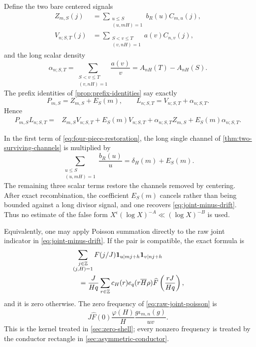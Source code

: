 Define the two bare centered signals
\begin{align}
 Z_{m,S}(j)&=
 \sum_{\substack{u\le S\\(u,mH)=1}}b_R(u)C_{m,u}(j),
 \label{eq:bare-short-signal}\\
 V_{n;S,T}(j)&=
 \sum_{\substack{S<v\le T\\(v,nH)=1}}a(v)C_{n,v}(j),
 \label{eq:bare-long-signal}
\end{align}
and the long scalar density
\begin{equation}
 \alpha_{n;S,T}
 =\sum_{\substack{S<v\le T\\(v,nH)=1}}\frac{a(v)}v
 =A_{nH}(T)-A_{nH}(S).
 \label{eq:long-scalar-density}
\end{equation}
The prefix identities of \cref{prop:prefix-identities} say exactly
\begin{equation}
 P_{m,S}=Z_{m,S}+E_S(m),
 \qquad
 L_{n;S,T}=V_{n;S,T}+\alpha_{n;S,T}.
 \label{eq:scalar-restoration}
\end{equation}
Hence
\begin{align}
 P_{m,S}L_{n;S,T}
 ={}&Z_{m,S}V_{n;S,T}
 +E_S(m)V_{n;S,T}
 +\alpha_{n;S,T}Z_{m,S}
 +E_S(m)\alpha_{n;S,T}.
 \label{eq:four-piece-restoration}
\end{align}

In the first term of \eqref{eq:four-piece-restoration}, the long
single channel of \cref{thm:two-surviving-channels} is multiplied by
\begin{equation}
 \sum_{\substack{u\le S\\(u,mH)=1}}\frac{b_R(u)}u
 =\delta_H(m)+E_S(m).
 \label{eq:bare-prefix-density}
\end{equation}
The remaining three scalar terms restore the channels removed by
centering.  After exact recombination, the coefficient
\(E_S(m)\) cancels rather than being bounded against a long divisor
signal, and one recovers \eqref{eq:joint-minus-drift}.  Thus no estimate
of the false form
\(X^\epsilon(\log X)^{-A}\ll(\log X)^{-B}\) is used.

Equivalently, one may apply Poisson summation directly to the raw joint
indicator in \eqref{eq:joint-minus-drift}.  If the pair is compatible,
the exact formula is
\begin{align}
 &\sum_{\substack{j\in\mathbb Z\\(j,H)=1}}F(j/J)
 \mathbf 1_{u\mid mj+h}\mathbf 1_{v\mid nj+h}
 \notag\\
 &\quad=
 \frac{J}{Hq}\sum_{r\in\mathbb Z}
 c_H(r)e_q(r\overline H\rho)
 \widehat F\left(\frac{rJ}{Hq}\right),
 \label{eq:raw-joint-poisson}
\end{align}
and it is zero otherwise.  The zero frequency of
\eqref{eq:raw-joint-poisson} is
\begin{equation}
 J\widehat F(0)\frac{\varphi(H)}H
 \frac{g\iota_{m,n}(g)}{uv}.
 \label{eq:raw-joint-zero}
\end{equation}
This is the kernel treated in \cref{sec:zero-shell}; every nonzero
frequency is treated by the conductor rectangle in
\cref{sec:asymmetric-conductor}.

